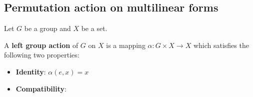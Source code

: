 \subsection{Permutation action on multilinear forms}

\begin{definition}
  Let $G$ be a group and $X$ be a set.

  A \textbf{left group action} of $G$ on $X$ is a mapping $\alpha : G \times X \to X$ which satisfies the following two properties:
  \begin{itemize}
    \item \textbf{Identity}: $\alpha(e, x) = x$
    \item \textbf{Compatibility}: 
  \end{itemize}
\end{definition}
